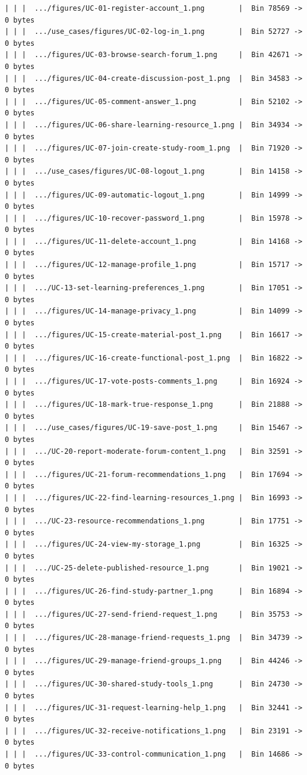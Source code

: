 \documentclass[12pt]{article}
\begin{document}
\begin{lstlisting}[numbers=none,breaklines=true]
| | |  .../figures/UC-01-register-account_1.png        |  Bin 78569 -> 0 bytes
| | |  .../use_cases/figures/UC-02-log-in_1.png        |  Bin 52727 -> 0 bytes
| | |  .../figures/UC-03-browse-search-forum_1.png     |  Bin 42671 -> 0 bytes
| | |  .../figures/UC-04-create-discussion-post_1.png  |  Bin 34583 -> 0 bytes
| | |  .../figures/UC-05-comment-answer_1.png          |  Bin 52102 -> 0 bytes
| | |  .../figures/UC-06-share-learning-resource_1.png |  Bin 34934 -> 0 bytes
| | |  .../figures/UC-07-join-create-study-room_1.png  |  Bin 71920 -> 0 bytes
| | |  .../use_cases/figures/UC-08-logout_1.png        |  Bin 14158 -> 0 bytes
| | |  .../figures/UC-09-automatic-logout_1.png        |  Bin 14999 -> 0 bytes
| | |  .../figures/UC-10-recover-password_1.png        |  Bin 15978 -> 0 bytes
| | |  .../figures/UC-11-delete-account_1.png          |  Bin 14168 -> 0 bytes
| | |  .../figures/UC-12-manage-profile_1.png          |  Bin 15717 -> 0 bytes
| | |  .../UC-13-set-learning-preferences_1.png        |  Bin 17051 -> 0 bytes
| | |  .../figures/UC-14-manage-privacy_1.png          |  Bin 14099 -> 0 bytes
| | |  .../figures/UC-15-create-material-post_1.png    |  Bin 16617 -> 0 bytes
| | |  .../figures/UC-16-create-functional-post_1.png  |  Bin 16822 -> 0 bytes
| | |  .../figures/UC-17-vote-posts-comments_1.png     |  Bin 16924 -> 0 bytes
| | |  .../figures/UC-18-mark-true-response_1.png      |  Bin 21888 -> 0 bytes
| | |  .../use_cases/figures/UC-19-save-post_1.png     |  Bin 15467 -> 0 bytes
| | |  .../UC-20-report-moderate-forum-content_1.png   |  Bin 32591 -> 0 bytes
| | |  .../figures/UC-21-forum-recommendations_1.png   |  Bin 17694 -> 0 bytes
| | |  .../figures/UC-22-find-learning-resources_1.png |  Bin 16993 -> 0 bytes
| | |  .../UC-23-resource-recommendations_1.png        |  Bin 17751 -> 0 bytes
| | |  .../figures/UC-24-view-my-storage_1.png         |  Bin 16325 -> 0 bytes
| | |  .../UC-25-delete-published-resource_1.png       |  Bin 19021 -> 0 bytes
| | |  .../figures/UC-26-find-study-partner_1.png      |  Bin 16894 -> 0 bytes
| | |  .../figures/UC-27-send-friend-request_1.png     |  Bin 35753 -> 0 bytes
| | |  .../figures/UC-28-manage-friend-requests_1.png  |  Bin 34739 -> 0 bytes
| | |  .../figures/UC-29-manage-friend-groups_1.png    |  Bin 44246 -> 0 bytes
| | |  .../figures/UC-30-shared-study-tools_1.png      |  Bin 24730 -> 0 bytes
| | |  .../figures/UC-31-request-learning-help_1.png   |  Bin 32441 -> 0 bytes
| | |  .../figures/UC-32-receive-notifications_1.png   |  Bin 23191 -> 0 bytes
| | |  .../figures/UC-33-control-communication_1.png   |  Bin 14686 -> 0 bytes

\end{lstlisting}
\end{document}
